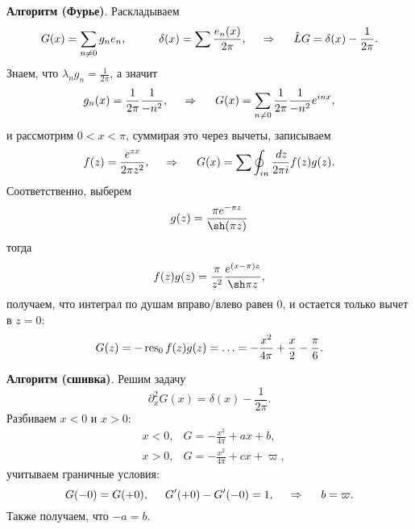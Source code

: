 
\textbf{Алгоритм (Фурье)}. Раскладываем 
\begin{equation*}
    G(x) = \sum_{n \neq 0} g_n e_n,
    \hspace{10 mm} 
    \delta(x) = \sum \frac{e_n (x)}{2 \pi},
    \hspace{0.5cm} \Rightarrow \hspace{0.5cm}
    \hat{L} G = \delta(x) - \frac{1}{2\pi}.
\end{equation*}
Знаем, что $\lambda_n g_n = \frac{1}{2\pi}$, а значит
\begin{equation*}
    g_n(x) = \frac{1}{2\pi} \frac{1}{- n^2},
    \hspace{0.5cm} \Rightarrow \hspace{0.5cm}   
    G(x) = \sum_{n \neq 0} \frac{1}{2\pi} \frac{1}{-n^2} e^{i n x},
\end{equation*}
и рассмотрим $0 < x < \pi$, суммирая это через вычеты, записываем
\begin{equation*}
    f(z) = \frac{e^{zx}}{2 \pi z^2}, 
    \hspace{0.5cm} \Rightarrow \hspace{0.5cm}   
    G(x) = \sum \oint_{in} \frac{\, d z}{2 \pi i} f(z) g(z).
\end{equation*}
Соответственно, выберем
\begin{align*}
    g(z) = \frac{\pi e^{- \pi z}}{\sh (\pi z)}
\end{align*}
тогда
\begin{equation*}
    f(z) g(z) = \frac{\pi}{z^2} \frac{e^{(x-\pi)z}}{\sh \pi z},
\end{equation*}
получаем, что интеграл по душам вправо/влево  равен $0$, и остается только вычет в $z = 0$:
\begin{equation*}
    G(z) = - \mathop{\mathrm{res}}\nolimits_0 f(z) g(z) = \ldots = - \frac{x^2}{4 \pi} + \frac{x}{2} - \frac{\pi}{6}.
\end{equation*}



\textbf{Алгоритм (сшивка)}. Решим задачу
\begin{equation*}
    \partial_x^2 G(x) = \delta(x) - \frac{1}{2\pi}.
\end{equation*}
Разбиваем $x < 0$ и $x > 0$:
\begin{align*}
    &x < 0, 
    & G = -\tfrac{x^2}{4 \pi} + a x + b, \\
    &x > 0, 
    & G = -\tfrac{x^2}{4 \pi} + c x + \varpi, 
\end{align*}
учитываем граничные условия:
\begin{equation*}
    G(-0) = G(+0),
    \hspace{5 mm} 
    G'(+0) - G'(-0) = 1,
    \hspace{0.5cm} \Rightarrow \hspace{0.5cm}   
    b = \varpi.
\end{equation*}
Также получаем, что $-a = b$.

